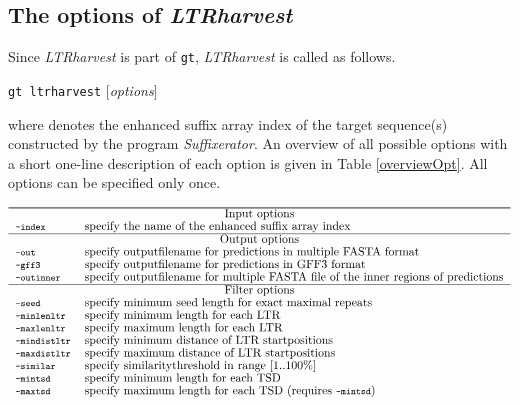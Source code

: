 \documentclass[12pt,titlepage]{article}
\newcommand{\LTRharvest}{\textit{LTRharvest}\xspace}
\newcommand{\Suffixerator}{\textit{Suffixerator}\xspace}
\newcommand{\Gtltrharvest}{\texttt{gt ltrharvest}\xspace}
\newcommand{\Gt}{\texttt{gt}\xspace}
\begin{document}
\subsection{The options of \LTRharvest} \label{Overview}

Since \LTRharvest is part of \Gt, \LTRharvest is called as follows.

\Gtltrharvest {}  $[$\emph{options}$]$

where  denotes the enhanced suffix array index of 
the target sequence(s) constructed by the program \Suffixerator. 
An overview of all possible options with a short one-line description of 
each option is given in Table \ref{overviewOpt}.
All options can be specified only once.

\begin{table}[htbp]
\caption{Overview of the \LTRharvest options sorted by categories.}
\begin{footnotesize}
\[
\renewcommand{\arraystretch}{0.89}
\begin{tabular}{ll}\hline
\Showoptiongroup{Input options}
\Showoption{index}& specify the name of the enhanced suffix array index
\\
\Showoptiongroup{Output options}
\Showoption{out}& specify outputfilename for predictions in multiple FASTA
format
\\
\Showoption{gff3}& specify outputfilename for predictions in GFF3 format
\\
\Showoption{outinner}& specify outputfilename for multiple FASTA file 
of the inner regions of predictions 
\\
\Showoptiongroup{Filter options}
\Showoption{seed}& specify minimum seed length for exact maximal repeats
\\
\Showoption{minlenltr}& specify minimum length for each LTR
\\
\Showoption{maxlenltr}& specify maximum length for each LTR
\\
\Showoption{mindistltr}& specify minimum distance of LTR
startpositions
\\
\Showoption{maxdistltr}& specify maximum distance of LTR
startpositions  
\\
\Showoption{similar}& specify similaritythreshold in range [1..100\%]
\\
\Showoption{mintsd}& specify minimum length for each TSD
\\
\Showoption{maxtsd}& specify maximum length for each TSD (requires 
\Showoption{mintsd}) 
\\

\end{tabular}\]
\end{footnotesize}
\end{table}
\end{document}
